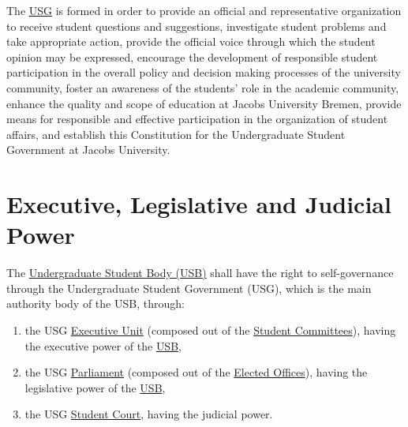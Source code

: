 \documentclass[12pt]{LaTeX_Misc/constitution}
\begin{document}

\label{PartA}

The \hyperref[USGdef]{USG} is formed in order to provide an official and representative organization to receive student questions and suggestions, investigate student problems and take appropriate action, provide the official voice through which the student opinion may be expressed, encourage the development of responsible student participation in the overall policy and decision making processes of the university community, foster an awareness of the students' role in the academic community, enhance the quality and scope of education at Jacobs University Bremen, provide means for responsible and effective participation in the organization of student affairs, and establish this Constitution for the Undergraduate Student Government at Jacobs University.


\section{Executive, Legislative and Judicial Power} 
The \hyperref[studentbody]{Undergraduate Student Body (USB)} shall have the right to self-governance through the Undergraduate Student Government (USG), which is the main authority body of the USB, through:
\begin{enumerate}
    \item the USG \hyperref[USGexecutiveUnitDef]{Executive Unit} (composed out of the \hyperref[USGstructure]{Student Committees}), having the executive power of the \hyperref[studentbody]{USB},
    \item the USG \hyperref[USGParliamentDef]{Parliament} \label{USGParliament} (composed out of the \hyperref[ElectedOfficesDef]{Elected Offices}), having the legislative power of the \hyperref[studentbody]{USB},
    \item the USG \hyperref[StudentCourtDef]{Student Court}, having the judicial power.
\end{enumerate}
\end{document}
